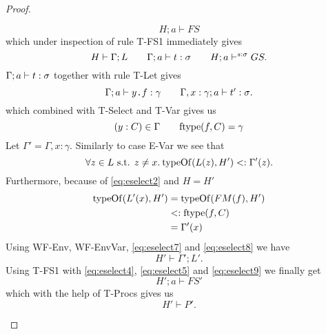 \begin{proof}
\begin{description}
\begin{description}
\begin{description}
              \begin{equation} \label{eq:eselect3}
                H; a \vdash FS
              \end{equation}
              which under inspection of rule {\sc T-FS1} immediately gives
              \begin{equation} \label{eq:eselect4}
                H \vdash \Gamma; L \quad\quad \mbox{$\Gamma;a\vdash t:\sigma$}
                \quad\quad H; a \vdash^{s: \sigma} GS.
              \end{equation}
              $\mbox{$\Gamma;a\vdash t:\sigma$}$ together with rule {\sc T-Let}
              gives
              \begin{equation} \label{eq:eselect5}
                \mbox{$\Gamma;a\vdash\mbox{$y$\texttt{.}$f$}:\gamma$} \quad\quad
                \mbox{$\Gamma, x: \gamma;a\vdash t':\sigma$}.
              \end{equation}
              which combined with {\sc T-Select} and {\sc T-Var} gives us
              \begin{equation} \label{eq:eselect6}
                (y: C) \in \Gamma \quad\quad \mbox{$\mathrm{ftype}$}(f, C) = \gamma
              \end{equation}
              Let $\Gamma' = \Gamma, x: \gamma$. Similarly to case {\sc E-Var}
              we see that
              \begin{equation} \label{eq:eselect7}
                \forall z \in L \text{ s.t. } z \neq x . \: \mbox{$\mathrm{typeOf}$}(L(z), H')
                <: \Gamma'(z).
              \end{equation}
              Furthermore, because of \eqref{eq:eselect2} and $H = H'$
              \begin{equation} \label{eq:eselect8}
                \begin{aligned}
                  \mbox{$\mathrm{typeOf}$}(L'(x), H') &= \mbox{$\mathrm{typeOf}$}(FM(f), H') \\
                                     &<: \mbox{$\mathrm{ftype}$}(f, C) \\
                                     &= \Gamma'(x)
                \end{aligned}
              \end{equation}
              Using {\sc WF-Env, WF-EnvVar}, \eqref{eq:eselect7} and
              \eqref{eq:eselect8} we have
              \begin{equation} \label{eq:eselect9}
                H' \vdash \Gamma';L'.
              \end{equation}
              Using {\sc T-FS1} with \eqref{eq:eselect4}, \eqref{eq:eselect5}
              and \eqref{eq:eselect9} we finally get
              \begin{equation}
                H';a \vdash FS'
              \end{equation}
              which with the help of {\sc T-Procs} gives us 
              \begin{equation*}
                H'\vdash P'.
              \end{equation*}
              

\end{description}
\end{description}
\end{description}
\end{proof}
